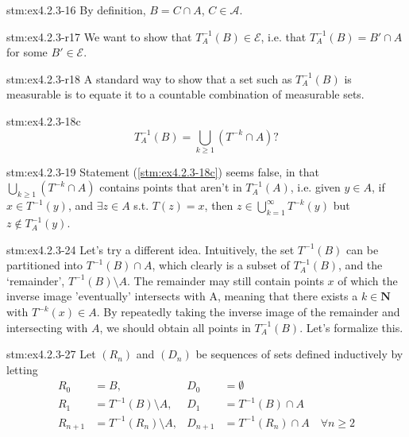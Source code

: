 \begin{statement}{stm:ex4.2.3-16}
By definition, $B = C \cap A$, $C \in \mathcal{A}$.
\end{statement}

\begin{explanation}{stm:ex4.2.3-r17}
We want to show that $T_A^{-1}(B) \in \mathcal{E}$, i.e. that $T_A^{-1}(B) = B' \cap A$ for some $B' \in \mathcal{E}$.
\end{explanation}

\begin{explanation}{stm:ex4.2.3-r18}
A standard way to show that a set such as $T_A^{-1}(B)$ is measurable is to equate it to a countable combination of measurable sets.
\end{explanation}

\begin{explanation}{stm:ex4.2.3-18c}
\[
T_A^{-1}(B) = \bigcup_{k \geq 1} (T^{-k} \cap A)?
\]
\end{explanation}

\begin{explanation}{stm:ex4.2.3-19}
Statement (\ref{stm:ex4.2.3-18c}) seems false, in that $\bigcup_{k \geq 1}(T^{-k} \cap A)$ contains points that aren't in $T_A^{-1}(A)$, i.e. given $y \in A$, if $x \in T^{-1}(y)$, and $\exists z \in A$ s.t. $T(z) = x$, then $z \in \bigcup_{k=1}^{\infty} T^{-k}(y)$ but $z \notin T_A^{-1}(y)$.
\end{explanation}

\begin{explanation}{stm:ex4.2.3-24}
Let's try a different idea. Intuitively, the set $T^{-1}(B)$ can be partitioned into $T^{-1}(B) \cap A$, which clearly is a subset of $T_A^{-1}(B)$, and the ‘remainder’, $T^{-1}(B) \setminus A$. The remainder may still contain points $x$ of which the inverse image 'eventually' intersects with A, meaning that there exists a $k \in \mathbf{N}$ with $T^{-k}(x) \in A$.  By repeatedly taking the inverse image of the remainder and intersecting with $A$, we should obtain all points in $T_A^{-1}(B)$. Let's formalize this.
\end{explanation}

\begin{statement}{stm:ex4.2.3-27}
Let $(R_n)$ and $(D_n)$ be sequences of sets defined inductively by letting
\begin{align*}
R_0 &= B, & D_0 &= \emptyset \\
R_1 &= T^{-1}(B) \setminus A, & D_1 &= T^{-1}(B) \cap A \\
R_{n+1} &= T^{-1}(R_n) \setminus A, & D_{n+1} &= T^{-1}(R_n) \cap A \quad \forall n \ge 2
\end{align*}
\end{statement}

